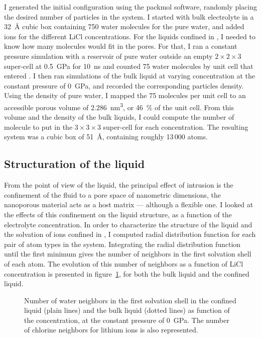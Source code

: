 \documentclass[thesis]{subfiles}
\begin{document}
I generated the initial configuration using the packmol
software\cite{Martnez2009}, randomly placing the desired number of particles in
the system. I started with bulk electrolyte in a \SI{32}{\AA} cubic box
containing 750 water molecules for the pure water, and added ions for the
different LiCl concentrations. For the liquids confined in , I needed to
know how many molecules would fit in the  pores. For that, I ran a constant
pressure simulation with a reservoir of pure water outside an empty
$2\times2\times3$  super-cell at \SI{0.5}{GPa} for \SI{10}{ns} and counted
75 water molecules by unit cell that entered . I then ran simulations of
the bulk liquid at varying concentration at the constant pressure of
\SI{0}{GPa}, and recorded the corresponding particles density. Using the density
of pure water, I mapped the 75 molecules per unit cell to an accessible porous
volume of \SI{2.286}{nm^3}, or 46~\% of the unit cell. From this volume and the
density of the bulk liquids, I could compute the number of molecule to put
in the $3\times3\times3$ super-cell for each concentration. The resulting
system was a cubic box of \SI{51}{\AA}, containing roughly 13\,000 atoms.

\subsection{Structuration of the liquid}
\label{sec:licl-zifliquid-structure}

From the point of view of the liquid, the principal effect of intrusion is the
confinement of the fluid to a pore space of nanometric dimensions, \ie the
nanoporous material acts as a host matrix --- although a flexible one. I looked
at the effects of this confinement on the liquid structure, as a function of the
electrolyte concentration. In order to characterize the structure of the liquid
and the solvation of ions confined in , I computed radial distribution
function for each pair of atom types in the system. Integrating the radial
distribution function until the first minimum gives the number of neighbors in
the first solvation shell of each atom. The evolution of this number of
neighbors as a function of LiCl concentration is presented in
figure~\ref{fig:licl-zif:neighbors}, for both the bulk liquid and the confined
liquid.

\begin{figure}[ht]
    \centering
    
    \caption{Number of water neighbors in the first solvation shell in the
    confined liquid (plain lines) and the bulk liquid (dotted lines) as
    function of the concentration, at the constant pressure of \SI{0}{GPa}.
    The number of chlorine neighbors for lithium ions is also represented.}
    \label{fig:licl-zif:neighbors}
\end{figure}
\end{document}

